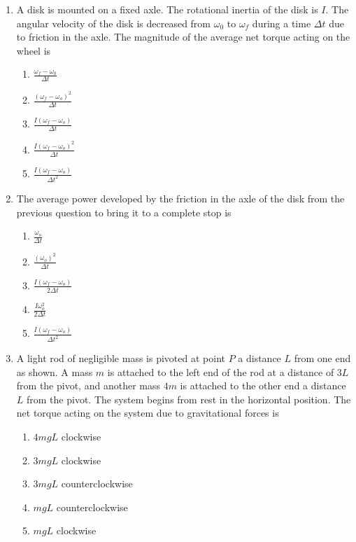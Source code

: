 \documentclass{../../../oss-apphys}
\begin{document}
\begin{multicols}{2}
\begin{enumerate}[leftmargin=18pt]
  \item A disk is mounted on a fixed axle. The rotational inertia of the disk is
    $I$. The angular velocity of the disk is decreased from $\omega_0$ to
    $\omega_f$ during a time $\Delta t$ due to friction in the axle. The
    magnitude of the average net torque acting on the wheel is
    \begin{enumerate}[noitemsep,topsep=0pt,leftmargin=18pt,label=(\Alph*)]
    \item $\displaystyle\frac{\omega_f-\omega_0}{\Delta t}$
    \item $\displaystyle\frac{(\omega_f-\omega_o)^2}{\Delta t}$
    \item $\displaystyle\frac{I(\omega_f-\omega_o)}{\Delta t}$
    \item $\displaystyle\frac{I(\omega_f-\omega_o)^2}{\Delta t}$
    \item $\displaystyle\frac{I(\omega_f-\omega_o)}{\Delta t^2}$
    \end{enumerate}
    \columnbreak
    
  \item The average power developed by the friction in the axle of the disk
    from the previous question to bring it to a complete stop is
    \begin{enumerate}[noitemsep,topsep=0pt,leftmargin=18pt,label=(\Alph*)]
    \item $\displaystyle\frac{\omega_o}{\Delta t}$
    \item $\displaystyle\frac{(\omega_o)^2}{\Delta t}$
    \item $\displaystyle\frac{I(\omega_f-\omega_o)}{2\Delta t}$
    \item $\displaystyle\frac{I\omega_o^2}{2\Delta t}$
    \item $\displaystyle\frac{I(\omega_f-\omega_o)}{\Delta t^2}$
    \end{enumerate}
    
  \item A light rod of negligible mass is pivoted at point $P$ a distance $L$
    from one end as shown. A mass $m$ is attached to the left end of the rod at
    a distance of $3L$ from the pivot, and another mass $4m$ is attached to the
    other end a distance $L$ from the pivot. The system begins from rest in the
    horizontal position. The net torque acting on the system due to
    gravitational forces is
    \begin{center}
    \end{center}
    \begin{enumerate}[noitemsep,topsep=0pt,leftmargin=18pt,label=(\Alph*)]
    \item $4mgL$ clockwise
    \item $3mgL$ clockwise
    \item $3mgL$ counterclockwise
    \item $mgL$ counterclockwise
    \item $mgL$ clockwise
    \end{enumerate}
    

\end{enumerate}
\end{multicols}
\end{document}
